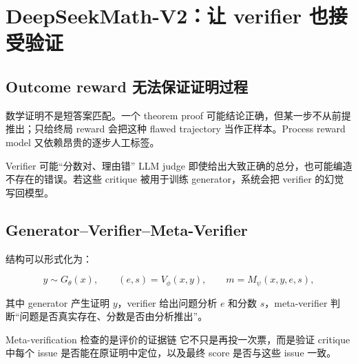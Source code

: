 \section{DeepSeekMath-V2：让 verifier 也接受验证}

\subsection{Outcome reward 无法保证证明过程}



数学证明不是短答案匹配。一个 theorem proof 可能结论正确，但某一步不从前提推出；只给终局 reward 会把这种 flawed trajectory 当作正样本。Process reward model 又依赖昂贵的逐步人工标签。

\begin{warningbox}{Verifier 可能“分数对、理由错”}
LLM judge 即使给出大致正确的总分，也可能编造不存在的错误。若这些 critique 被用于训练 generator，系统会把 verifier 的幻觉写回模型。
\end{warningbox}

\subsection{Generator--Verifier--Meta-Verifier}


结构可以形式化为：

$$
y\sim G_\theta(x),\qquad
(e,s)=V_\phi(x,y),\qquad
m=M_\psi(x,y,e,s),
$$

其中 generator 产生证明 $y$，verifier 给出问题分析 $e$ 和分数 $s$，meta-verifier 判断“问题是否真实存在、分数是否由分析推出”。


\begin{importantbox}{Meta-verification 检查的是评价的证据链}
它不只是再投一次票，而是验证 critique 中每个 issue 是否能在原证明中定位，以及最终 score 是否与这些 issue 一致。
\end{importantbox}

